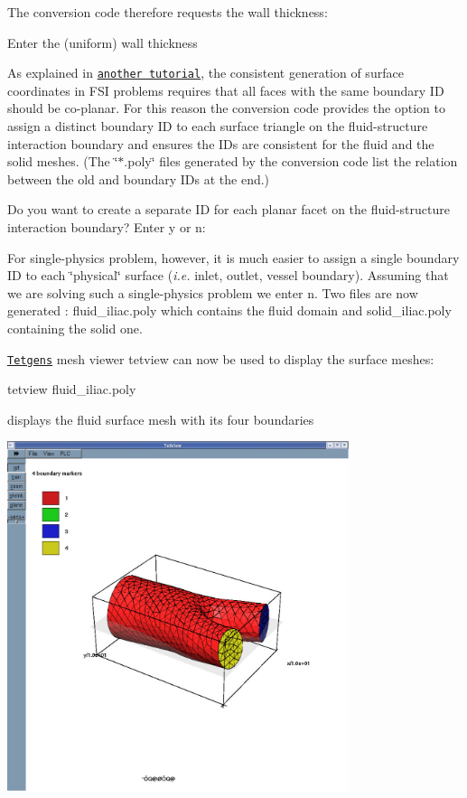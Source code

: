 The conversion code therefore requests the wall thickness\+:


\begin{DoxyCode}
Enter the (uniform) wall thickness
\end{DoxyCode}


As explained in \href{../../../interaction/unstructured_three_d_fsi/html/index.html}{\tt another tutorial}, the consistent generation of surface coordinates in F\+SI problems requires that all faces with the same boundary ID should be co-\/planar. For this reason the conversion code provides the option to assign a distinct boundary ID to each surface triangle on the fluid-\/structure interaction boundary and ensures the I\+Ds are consistent for the fluid and the solid meshes. (The \char`\"{}$\ast$.\+poly\char`\"{} files generated by the conversion code list the relation between the old and boundary I\+Ds at the end.)


\begin{DoxyCode}
Do you want to create a separate ID \textcolor{keywordflow}{for each} planar facet
on the fluid-structure interaction boundary?
Enter y or n: 
\end{DoxyCode}


For single-\/physics problem, however, it is much easier to assign a single boundary ID to each \char`\"{}physical\char`\"{} surface ({\itshape  i.\+e. } inlet, outlet, vessel boundary). Assuming that we are solving such a single-\/physics problem we enter {\ttfamily n}. Two files are now generated \+: {\ttfamily fluid\+\_\+iliac.\+poly} which contains the fluid domain and {\ttfamily solid\+\_\+iliac.\+poly} containing the solid one.

\href{http://wias-berlin.de/software/tetgen//tetview.html}{\tt Tetgen\textquotesingle{}s} mesh viewer {\ttfamily tetview} can now be used to display the surface meshes\+: 
\begin{DoxyCode}
tetview fluid\_iliac.poly
\end{DoxyCode}
 displays the fluid surface mesh with its four boundaries

 
\begin{DoxyImageNoCaption}
  \mbox{\includegraphics[width=0.75\textwidth]{fluid1}}
\end{DoxyImageNoCaption}
  
